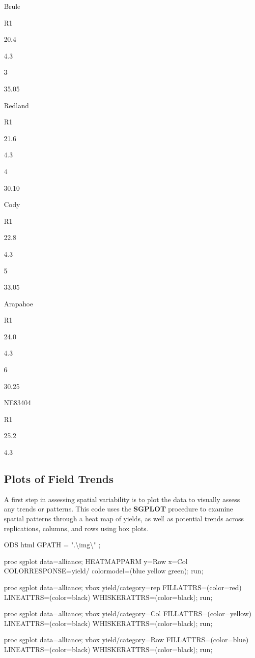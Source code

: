\documentclass[
]{book}
\newenvironment{Shaded}{\begin{snugshade}}{\end{snugshade}}
\newcommand{\NormalTok}[1]{#1}
\begin{document}
Brule

R1

20.4

4.3

3

35.05

Redland

R1

21.6

4.3

4

30.10

Cody

R1

22.8

4.3

5

33.05

Arapahoe

R1

24.0

4.3

6

30.25

NE83404

R1

25.2

4.3

\hypertarget{plots-of-field-trends}{%
\subsection{Plots of Field Trends}\label{plots-of-field-trends}}

A first step in assessing spatial variability is to plot the data to visually assess any trends or patterns. This code uses the \textbf{SGPLOT} procedure to examine spatial patterns through a heat map of yields, as well as potential trends across replications, columns, and rows using box plots.

\begin{Shaded}
\begin{Highlighting}[]
\NormalTok{ODS html GPATH = ".\textbackslash{}img\textbackslash{}" ;}

\NormalTok{proc sgplot data=alliance;}
\NormalTok{    HEATMAPPARM y=Row x=Col COLORRESPONSE=yield/ colormodel=(blue yellow green); }
\NormalTok{run;}

\NormalTok{proc sgplot data=alliance;}
\NormalTok{    vbox yield/category=rep FILLATTRS=(color=red) LINEATTRS=(color=black) WHISKERATTRS=(color=black);}
\NormalTok{run;}

\NormalTok{proc sgplot data=alliance;}
\NormalTok{    vbox yield/category=Col FILLATTRS=(color=yellow) LINEATTRS=(color=black) WHISKERATTRS=(color=black);}
\NormalTok{run;}

\NormalTok{proc sgplot data=alliance;}
\NormalTok{    vbox yield/category=Row FILLATTRS=(color=blue) LINEATTRS=(color=black) WHISKERATTRS=(color=black);}
\NormalTok{run;}
\end{Highlighting}
\end{Shaded}
\end{document}
